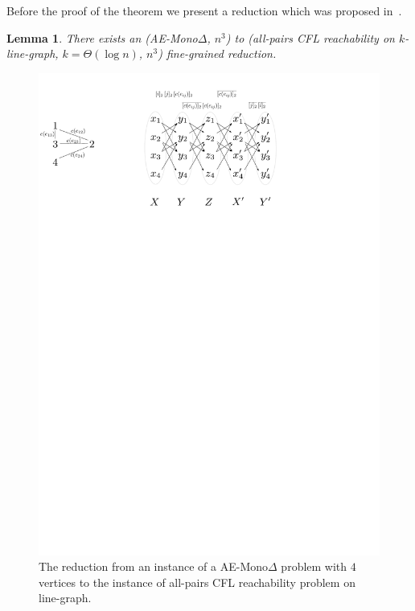\documentclass[12pt]{article}
\newtheorem{lemma}{Lemma}[section]
\begin{document}
Before the proof of the theorem we present a reduction which was proposed in~\cite{10.1145/3571252}.

\begin{lemma}{\cite{10.1145/3571252}}\label{lemma:no_exp_help}
There exists an (AE-Mono$\Delta$, $n^3$) to (all-pairs CFL reachability on $k$-line-graph, $k = \Theta(\log n)$, $n^3$) fine-grained reduction.
\end{lemma}

\begin{figure}[!htp]
		
	\begin{center}  
		\includegraphics[scale=1]{pictures/ae-monotr_to_cflr.pdf}
	\end{center}
	
	\caption{The reduction from an instance of a AE-Mono$\Delta$ problem with $4$ vertices to the instance of all-pairs CFL reachability problem on line-graph.}
	\label{fig:ae_mono_to_cflr}
	
\end{figure}
\end{document}
